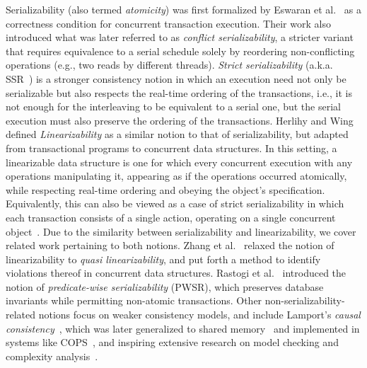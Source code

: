 Serializability (also termed 
\textit{atomicity}) was first formalized by Eswaran et al.~\cite{EsGrKoTr76} as 
a 
correctness condition for concurrent transaction execution. 
Their work also introduced what was later referred to as \textit{conflict 
serializability}, a stricter variant that requires equivalence to a serial 
schedule solely by reordering non-conflicting operations (e.g., two reads by 
different threads). 
%
\textit{Strict serializability} (a.k.a. SSR~\cite{Pa79}) is a stronger 
consistency 
notion in which an execution need not only be serializable but also respects 
the real-time ordering of the transactions, i.e., it is not enough for the 
interleaving to be equivalent to a serial one, but the serial execution must 
also preserve the ordering of the transactions.
%
%
%
%
Herlihy and Wing~\cite{HeWe87, HeWi90} defined \textit{Linearizability} as a 
similar notion to that of serializability, but adapted from transactional 
programs 
to concurrent data structures. In this setting, a linearizable data structure 
is one for which every concurrent execution 
with any operations manipulating it, appearing as if the operations occurred 
atomically, while respecting real-time ordering and obeying the object's 
specification. 
%
Equivalently, this can also be viewed as a case of strict serializability in 
which each transaction consists of a single action, operating on a single 
concurrent object~\cite{WaSt06a}.
%
Due to the similarity between serializability and linearizability, we cover 
related work pertaining to both notions.
%
Zhang et al.~\cite{ZhChWa13} relaxed the notion of linearizability to 
\textit{quasi 
linearizability}, and put forth a method to identify violations thereof in 
concurrent data structures.
%
Rastogi et al.~\cite{RaMeBrKoSi93} introduced the notion of 
\textit{predicate-wise serializability} (PWSR), which preserves database 
invariants 
while permitting non-atomic transactions.
%
Other non-serializability-related notions focus on weaker consistency models, 
and include Lamport’s \textit{causal 
consistency}~\cite{La78}, which was later generalized to shared 
memory~\cite{AhNeBuKoHu95} 
and implemented in systems like 
COPS~\cite{LlFrKaAn11}, and inspiring extensive research on model checking and 
complexity analysis~\cite{BoEnGuHa17,ZeBiBoEnEr19,LaBo20}. 


